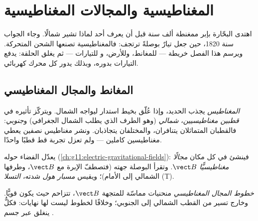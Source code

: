 \chapter{المغناطيسية والمجالات المغناطيسية}\label{ch:g11:magnetic-fields}

اهتدى البحّارة بإبر ممغنطة ألف سنة قبل أن
يعرف أحد لماذا تشير شمالًا. وجاء الجواب سنة 1820، حين
جعل تيارٌ بوصلةً ترتجف: فالمغناطيسية تصنعها الشحن المتحركة.
ويرسم هذا الفصل خريطة  --- للمغانط، وللأرض، و
للتيارات --- ثم يغلق الحلقة:  يدفع التيارات بدوره،
وبذلك يدور كل محرك كهربائي.

\section{المغانط والمجال المغناطيسي}

\begin{definition}\label{def:g11:magnetic-fields:magnet}
\emph{المغناطيس} يجذب الحديد، وإذا عُلّق بخيط
استدار ليواجه الشمال. ويتركّز تأثيره في \emph{قطبين
مغناطيسيين}، \emph{شمالي} (وهو الطرف الذي يطلب
الشمال الجغرافي) و\emph{جنوبي}: فالقطبان المتماثلان يتنافران، والمختلفان يتجاذبان.
ونشر مغناطيس نصفين يعطي مغناطيسين كاملين --- ولم تعزل
تجربة قط قطبًا واحدًا.
\end{definition}

\begin{definition}\label{def:g11:magnetic-fields:bfield}
يعدّل  الفضاء حوله
(\cref{ch:g11:electric-gravitational-fields}): فينشئ في كل مكان
\emph{مجالًا مغناطيسيًّا} $\vect B$. وتقرأ البوصلة
جهته (فتصطفّ الإبرة مع $\vect B$، وطرفها الشمالي إلى الأمام)؛ ويقيس
\emph{مسبار هول} شدته، 
\emph{التسلا} (\unit{T}).
\end{definition}

\begin{definition}\label{def:g11:magnetic-fields:lines}
\emph{خطوط المجال المغناطيسي} منحنيات
مماسّة للمتجهة $\vect B$، تتزاحم حيث يكون  قويًّا. وخارج
 تسير من القطب الشمالي إلى الجنوبي؛ وخلافًا لخطوط 
ليست لها نهايات: فكلٌّ ينغلق عبر جسم .
\end{definition}

